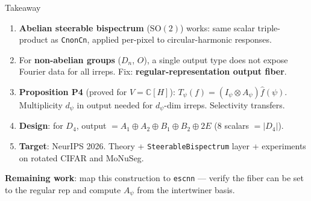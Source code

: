 \documentclass[aspectratio=169]{beamer}
\newcommand{\C}{\mathbb{C}}
\newcommand{\SO}{\mathrm{SO}}
\begin{document}
\begin{frame}{Takeaway}\small
  \begin{enumerate}\setlength{\itemsep}{4pt}
    \item \textbf{Abelian steerable bispectrum} ($\SO(2)$) works: same scalar triple-product as \texttt{CnonCn}, applied per-pixel to circular-harmonic responses.

    \item For \textbf{non-abelian groups} ($D_n$, $O$), a single output type does not expose Fourier data for all irreps. Fix: \textbf{regular-representation output fiber}.

    \item \textbf{Proposition P4} (proved for $V = \C[H]$): $T_\psi(f) = (I_\psi \otimes A_\psi)\hat{f}(\psi)$. Multiplicity $d_\psi$ in output needed for $d_\psi$-dim irreps. Selectivity transfers.

    \item \textbf{Design}: for $D_4$, output $= A_1 \oplus A_2 \oplus B_1 \oplus B_2 \oplus 2E$ (8 scalars $= |D_4|$).

    \item \textbf{Target}: NeurIPS 2026. Theory + \texttt{SteerableBispectrum} layer + experiments on rotated CIFAR and MoNuSeg.
  \end{enumerate}

  \medskip

  \textbf{Remaining work}: map this construction to \texttt{escnn} --- verify the fiber can be set to the regular rep and compute $A_\psi$ from the intertwiner basis.
\end{frame}
\end{document}
